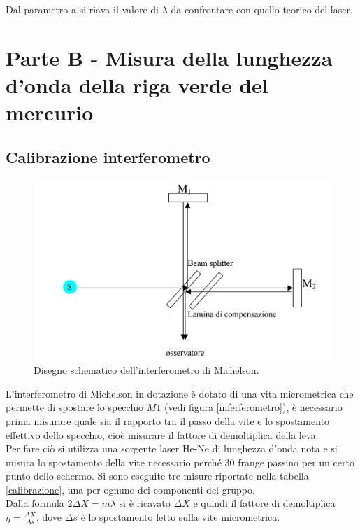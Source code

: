 \documentclass[10pt,a4paper]{article}
\begin{document}
Dal parametro a si riava il valore di $\lambda$ da confrontare con quello teorico del laser.

\section{Parte B - Misura della lunghezza d'onda della riga verde del mercurio}
\subsection{Calibrazione interferometro}

\begin{figure}[!htb]
  \centering
  \includegraphics[scale=.5]{interferometro.png}
\caption{Disegno schematico dell'interferometro di Michelson.}
\label{parteAfigura}
\end{figure}

L'interferometro di Michelson in dotazione è dotato di una vita micrometrica che permette di spostare lo specchio $M1$ (vedi figura \ref{inferferometro}), è necessario prima misurare quale sia il rapporto tra il passo della vite e lo spostamento effettivo dello specchio, cioè misurare il fattore di demoltiplica della leva. \\
Per fare ciò si utilizza una sorgente laser He-Ne di lunghezza d'onda nota e si misura lo spostamento della vite necessario perché 30 frange passino per un certo punto dello schermo. Si sono eseguite tre misure riportate nella tabella \ref{calibrazione}, una per ognuno dei componenti del gruppo.\\

Dalla formula $2 \Delta X = m \lambda$ si è ricavato $\Delta X$ e quindi il fattore di demoltiplica $\eta = \frac{\Delta X}{\Delta s}$, dove $\Delta s$ è lo spostamento letto sulla vite micrometrica.
\end{document}

